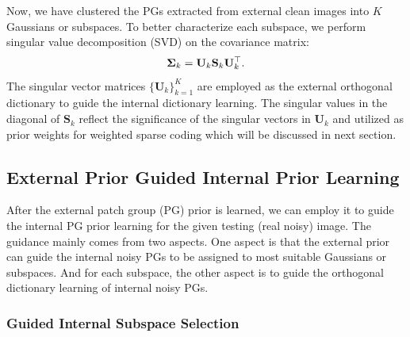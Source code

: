 \documentclass[10pt,twocolumn,letterpaper]{article}
\begin{document}
Now, we have clustered the PGs extracted from external clean images into $K$ Gaussians or subspaces. To better characterize each subspace, we perform singular value decomposition (SVD) on the covariance matrix:
\vspace{-2mm}
\begin{equation}\label{equ3}\vspace{-2mm}
\mathbf{\Sigma}_{k}=\mathbf{U}_{k}\mathbf{S}_{k}\mathbf{U}_{k}^{\top}.
\end{equation}
The singular vector matrices $\{\mathbf{U}_{k}\}_{k=1}^{K}$ are employed as the external orthogonal dictionary to guide the internal dictionary learning. The singular values in the diagonal of $\mathbf{S}_{k}$ reflect the significance of the singular vectors in $\mathbf{U}_{k}$ and utilized as prior weights for weighted sparse coding which will be discussed in next section.

\subsection{External Prior Guided Internal Prior Learning}

After the external patch group (PG) prior is learned, we can employ it to guide the internal PG prior learning for the given testing (real noisy) image. The guidance mainly comes from two aspects. One aspect is that the external prior can guide the internal noisy PGs to be assigned to most suitable Gaussians or subspaces. And for each subspace, the other aspect is to guide the orthogonal dictionary learning of internal noisy PGs.

\vspace{-2mm}
\subsubsection{Guided Internal Subspace Selection}
\vspace{-1mm}
\end{document}
